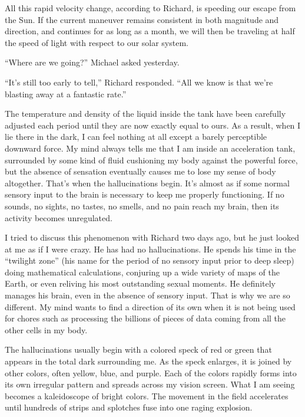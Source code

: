 \documentclass[]{article}
\begin{document}
All this rapid velocity change, according to Richard, is speeding our escape from the Sun. If the current maneuver remains consistent in both magnitude and direction, and continues for as long as a month, we will then be traveling at half the speed of light with respect to our solar system.

“Where are we going?” Michael asked yesterday.

“It’s still too early to tell,” Richard responded. “All we know is that we’re blasting away at a fantastic rate.”

The temperature and density of the liquid inside the tank have been carefully adjusted each period until they are now exactly equal to ours. As a result, when I lie there in the dark, I can feel nothing at all except a barely perceptible downward force. My mind always tells me that I am inside an acceleration tank, surrounded by some kind of fluid cushioning my body against the powerful force, but the absence of sensation eventually causes me to lose my sense of body altogether. That’s when the hallucinations begin. It’s almost as if some normal sensory input to the brain is necessary to keep me properly functioning. If no sounds, no sights, no tastes, no smells, and no pain reach my brain, then its activity becomes unregulated.

I tried to discuss this phenomenon with Richard two days ago, but he just looked at me as if I were crazy. He has had no hallucinations. He spends his time in the “twilight zone” (his name for the period of no sensory input prior to deep sleep) doing mathematical calculations, conjuring up a wide variety of maps of the Earth, or even reliving his most outstanding sexual moments. He definitely manages his brain, even in the absence of sensory input. That is why we are so different. My mind wants to find a direction of its own when it is not being used for chores such as processing the billions of pieces of data coming from all the other cells in my body.

The hallucinations usually begin with a colored speck of red or green that appears in the total dark surrounding me. As the speck enlarges, it is joined by other colors, often yellow, blue, and purple. Each of the colors rapidly forms into its own irregular pattern and spreads across my vision screen. What I am seeing becomes a kaleidoscope of bright colors. The movement in the field accelerates until hundreds of strips and splotches fuse into one raging explosion.
\end{document}
